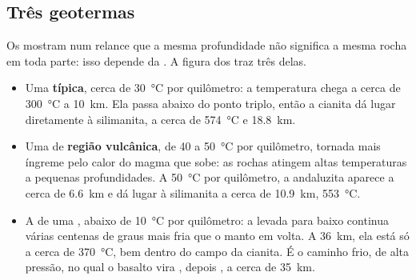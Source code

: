 \subsection{Três geotermas}

Os  mostram num relance que a mesma profundidade não significa a
mesma rocha em toda parte: isso depende da . A figura dos
 traz três delas.

\begin{itemize}
  \item Uma  \textbf{típica}, cerca de \qty{30}{\celsius} por
        quilômetro: a temperatura chega a cerca de \qty{300}{\celsius} a
        \qty{10}{km}. Ela passa abaixo do ponto triplo, então a cianita dá
        lugar diretamente à silimanita, a cerca de \qty{574}{\celsius} e
        \qty{18.8}{km}.
  \item Uma  de \textbf{região vulcânica}, de 40 a
        \qty{50}{\celsius} por quilômetro, tornada mais íngreme pelo calor
        do magma que sobe: as rochas atingem altas temperaturas a pequenas
        profundidades. A \qty{50}{\celsius} por quilômetro, a andaluzita
        aparece a cerca de \qty{6.6}{km} e dá lugar à silimanita a cerca de
        \qty{10.9}{km}, \qty{553}{\celsius}.
  \item A  de uma \textbf{}, abaixo de
        \qty{10}{\celsius} por quilômetro: a  levada para
        baixo continua várias centenas de graus mais fria que o manto em
        volta. A \qty{36}{km}, ela está só a cerca de \qty{370}{\celsius},
        bem dentro do campo da cianita. É o caminho frio, de alta pressão,
        no qual o basalto vira , depois , a cerca de
        \qty{35}{km}.
\end{itemize}

